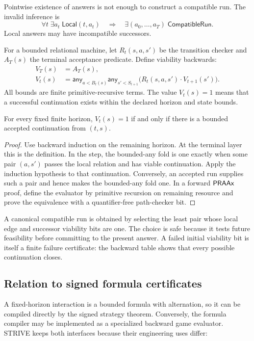 Pointwise existence of answers is not enough to construct a compatible run.
The invalid inference is
\[
  \forall t\;\exists a_t\;\mathsf{Local}(t,a_t)
  \quad\Longrightarrow\quad
  \exists(a_0,\ldots,a_T)\;\mathsf{CompatibleRun}.
\]
Local answers may have incompatible successors.

For a bounded relational machine, let \(R_t(s,a,s')\) be the transition
checker and \(A_T(s)\) the terminal acceptance predicate.  Define viability
backwards:
\begin{align*}
 V_T(s)&=A_T(s),\\
 V_t(s)&=\mathsf{any}_{a<B_t(s)}
   \mathsf{any}_{s'<S_{t+1}}
     \bigl(R_t(s,a,s')\cdot V_{t+1}(s')\bigr).
\end{align*}
All bounds are finite primitive-recursive terms.  The value
\(V_t(s)=1\) means that a successful continuation exists within the declared
horizon and state bounds.

\begin{theorem}
For every fixed finite horizon, \(V_t(s)=1\) if and only if there is a bounded
accepted continuation from \((t,s)\).
\end{theorem}

\begin{proof}
Use backward induction on the remaining horizon.  At the terminal layer this is
the definition.  In the step, the bounded-any fold is one exactly when some
pair \((a,s')\) passes the local relation and has viable continuation.  Apply
the induction hypothesis to that continuation.  Conversely, an accepted run
supplies such a pair and hence makes the bounded-any fold one.  In a forward
\(\mathsf{PRAAx}\) proof, define the evaluator by primitive recursion on remaining
resource and prove the equivalence with a quantifier-free path-checker bit.
\end{proof}

A canonical compatible run is obtained by selecting the least pair whose local
edge and successor viability bits are one.  The choice is safe because it tests
future feasibility before committing to the present answer.  A failed initial
viability bit is itself a finite failure certificate: the backward table shows
that every possible continuation closes.

\subsection{Relation to signed formula certificates}

A fixed-horizon interaction is a bounded formula with alternation, so it can be
compiled directly by the signed strategy theorem.  Conversely, the formula
compiler may be implemented as a specialized backward game evaluator.  STRIVE
keeps both interfaces because their engineering uses differ:

